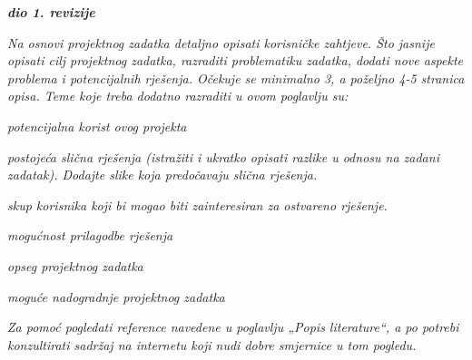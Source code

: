 \textbf{\textit{dio 1. revizije}}\\

{\color{red}\textit{Na osnovi projektnog zadatka detaljno opisati korisničke zahtjeve. Što jasnije opisati cilj projektnog zadatka, razraditi problematiku zadatka, dodati nove aspekte problema i potencijalnih rješenja. Očekuje se minimalno 3, a poželjno 4-5 stranica opisa.	Teme koje treba dodatno razraditi u ovom poglavlju su:}
\begin{packed_item}
	\item \textit{potencijalna korist ovog projekta}
	\item \textit{postojeća slična rješenja (istražiti i ukratko opisati razlike u odnosu na zadani zadatak). Dodajte slike koja predočavaju slična rješenja.}
	\item \textit{skup korisnika koji bi mogao biti zainteresiran za ostvareno rješenje.}
	\item \textit{mogućnost prilagodbe rješenja }
	\item \textit{opseg projektnog zadatka}
	\item \textit{moguće nadogradnje projektnog zadatka}
\end{packed_item}

\textit{Za pomoć pogledati reference navedene u poglavlju „Popis literature“, a po potrebi konzultirati sadržaj na internetu koji nudi dobre smjernice u tom pogledu.}
\eject
}





